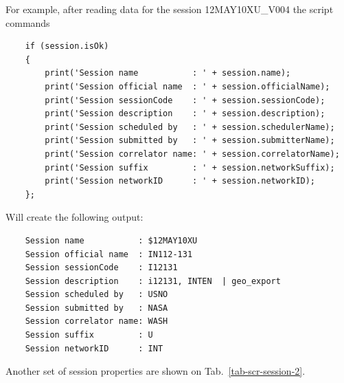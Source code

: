 \documentclass [10pt,letterpaper]{report}
\begin{document}
\noindent
For example, after reading data for the session 12MAY10XU\_V004 the script commands
{\small\begin{verbatim}
    if (session.isOk)
    {
        print('Session name           : ' + session.name);
        print('Session official name  : ' + session.officialName);
        print('Session sessionCode    : ' + session.sessionCode);
        print('Session description    : ' + session.description);
        print('Session scheduled by   : ' + session.schedulerName);
        print('Session submitted by   : ' + session.submitterName);
        print('Session correlator name: ' + session.correlatorName);
        print('Session suffix         : ' + session.networkSuffix);
        print('Session networkID      : ' + session.networkID);
    };
\end{verbatim}}
\noindent
Will create the following output:
{\small\begin{verbatim}
    Session name           : $12MAY10XU
    Session official name  : IN112-131
    Session sessionCode    : I12131
    Session description    : i12131, INTEN  | geo_export
    Session scheduled by   : USNO
    Session submitted by   : NASA
    Session correlator name: WASH
    Session suffix         : U
    Session networkID      : INT
\end{verbatim}}

Another set of session properties are shown on Tab.~\ref{tab-scr-session-2}.
\end{document}
